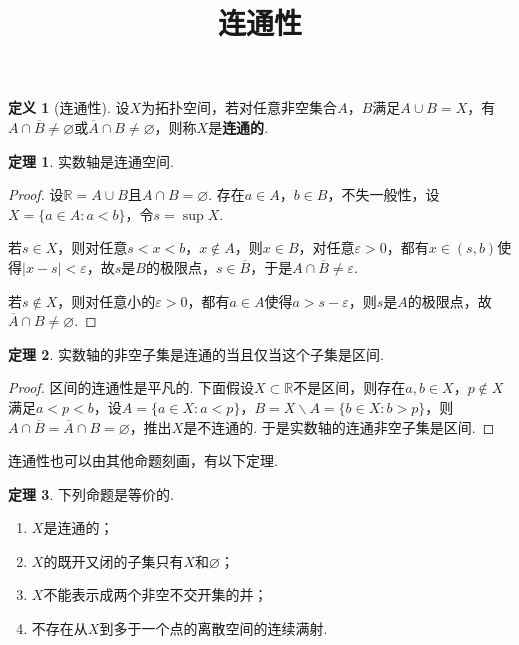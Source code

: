 \documentclass[12pt]{ctexart}
\title{\vspace{-2em}\textbf{连通性}\vspace{-2em}}
\date{ }
\theoremstyle{definition}
\newtheorem{definition}{定义}
\newtheorem{theorem}{定理}
\theoremstyle{plain}
\begin{document}
	\maketitle
	\begin{definition}[连通性]
		设$X$为拓扑空间，若对任意非空集合$A$，$B$满足$A\cup B=X$，有$A\cap\overline{B}\neq\varnothing$或$\overline{A}\cap B\neq\varnothing$，则称$X$是\textbf{连通的}.
	\end{definition}
	\begin{theorem}
		实数轴是连通空间.
	\end{theorem}
	\begin{proof}
		设$\mathbb{R}=A\cup B$且$A\cap B=\varnothing$. 存在$a\in A$，$b\in B$，不失一般性，设$X=\{a\in A:a<b\}$，令$s=\sup X$.
		
		若$s\in X$，则对任意$s<x<b$，$x\notin A$，则$x\in B$，对任意$\varepsilon>0$，都有$x\in(s,b)$使得$|x-s|<\varepsilon$，故$s$是$B$的极限点，$s\in\overline{B}$，于是$A\cap\overline{B}\neq\varepsilon$.
		
		若$s\notin X$，则对任意小的$\varepsilon>0$，都有$a\in A$使得$a>s-\varepsilon$，则$s$是$A$的极限点，故$\overline{A}\cap B\neq\varnothing$.
	\end{proof}
	\begin{theorem}\label{itvconnect}
		实数轴的非空子集是连通的当且仅当这个子集是区间.
	\end{theorem}
	\begin{proof}
		区间的连通性是平凡的. 下面假设$X\subset\mathbb{R}$不是区间，则存在$a,b\in X$，$p\notin X$满足$a<p<b$，设$A=\{a\in X:a<p\}$，$B=X\backslash A=\{b\in X:b>p\}$，则$A\cap\overline{B}=\overline{A}\cap B=\varnothing$，推出$X$是不连通的. 于是实数轴的连通非空子集是区间.
	\end{proof}
	连通性也可以由其他命题刻画，有以下定理.
	\begin{theorem}
		下列命题是等价的.
		\begin{enumerate}
			\item $X$是连通的；
			\item $X$的既开又闭的子集只有$X$和$\varnothing$；
			\item $X$不能表示成两个非空不交开集的并；
			\item 不存在从$X$到多于一个点的离散空间的连续满射.
		\end{enumerate}
	\end{theorem}
\end{document}
